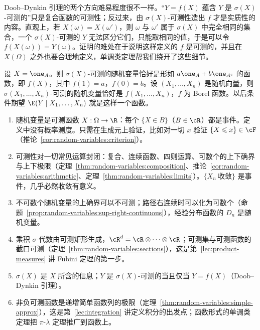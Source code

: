 \begin{remark}
Doob--Dynkin 引理的两个方向难易程度很不一样。“$Y=f(X)$ 蕴含 $Y$ 是 $\sigma(X)$-可测的”只是复合函数的可测性；反过来，由 $\sigma(X)$-可测性造出 $f$ 才是实质性的内容。直观上，若 $X(\omega)=X(\omega')$，则 $\omega$ 与 $\omega'$ 属于 $\sigma(X)$ 中完全相同的集合，一个 $\sigma(X)$-可测的 $Y$ 无法区分它们，只能取相同的值，于是可以令 $f(X(\omega))=Y(\omega)$。证明的难处在于说明这样定义的 $f$ 是可测的，并且在 $X(\Omega)$ 之外也要合理地定义，单调类定理帮我们绕开了这些细节。
\end{remark}

\begin{example}
设 $X=\one_A$。则 $\sigma(X)$-可测的随机变量恰好是形如 $a\one_A+b\one_{A^c}$ 的函数，即 $f(X)$，其中 $f(1)=a$，$f(0)=b$。设 $(X_1,\dots,X_n)$ 是随机向量，则 $\sigma(X_1,\dots,X_n)$-可测的随机变量恰好是 $f(X_1,\dots,X_n)$，$f$ 为 Borel 函数。以后条件期望 $\E(Y\mid X_1,\dots,X_n)$ 就是这样一个函数。
\end{example}


\begin{enumerate}
\item 随机变量是可测函数 $X:\Omega\to\R$：每个 $\{X\in B\}$（$B\in\cR$）都是事件。定义中没有概率测度。只需在生成元上验证，比如对一切 $x$ 验证 $\{X\leqslant x\}\in\cF$（推论~\ref{cor:random-variables:criterion}）。
\item 可测性对一切常见运算封闭：复合、连续函数、四则运算、可数个的上下确界与上下极限（定理~\ref{thm:random-variables:composition}、推论~\ref{cor:random-variables:arithmetic}、定理~\ref{thm:random-variables:limits}）。$\{X_n\ \text{收敛}\}$ 是事件，几乎必然收敛有意义。
\item 不可数个随机变量的上确界可以不可测；路径右连续时可以化为可数个（命题~\ref{prop:random-variables:sup-right-continuous}），经验分布函数的 $D_n$ 是随机变量。
\item 乘积 $\sigma$-代数由可测矩形生成，$\cR^d=\cR\otimes\cdots\otimes\cR$；可测集与可测函数的截口可测（定理~\ref{thm:random-variables:sections}），这是第~\ref{lec:product-measures} 讲 Fubini 定理的第一步。
\item $\sigma(X)$ 是 $X$ 所含的信息；$Y$ 是 $\sigma(X)$-可测的当且仅当 $Y=f(X)$（Doob--Dynkin 引理）。
\item 非负可测函数是递增简单函数列的极限（定理~\ref{thm:random-variables:simple-approx}），这是第~\ref{lec:integration} 讲定义积分的出发点；函数形式的单调类定理把 $\pi$-$\lambda$ 定理推广到函数上。
\end{enumerate}

